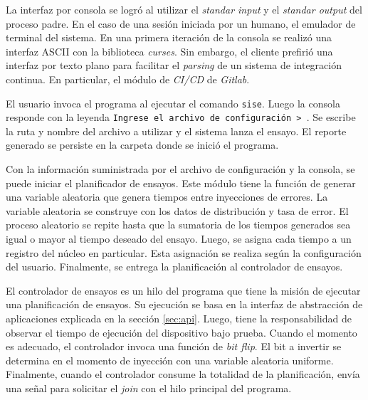 
La interfaz por consola se logró al utilizar el \emph{standar input} y el \emph{standar output} del proceso padre.
En el caso de una sesión iniciada por un humano, el emulador de terminal del sistema.
En una primera iteración de la consola se realizó una interfaz ASCII con la biblioteca \emph{curses}.
Sin embargo, el cliente prefirió una interfaz por texto plano para facilitar el \emph{parsing} de un sistema de integración continua.
En particular, el módulo de \emph{CI/CD} de \emph{Gitlab}.

El usuario invoca el programa al ejecutar el comando \texttt{sise}.
Luego la consola responde con la leyenda \texttt{Ingrese el archivo de configuración > }.
Se escribe la ruta y nombre del archivo a utilizar y el sistema lanza el ensayo.
El reporte generado se persiste en la carpeta donde se inició el programa.


Con la información suministrada por el archivo de configuración y la consola, se puede iniciar el planificador de ensayos.
Este módulo tiene la función de generar una variable aleatoria que genera tiempos entre inyecciones de errores.
La variable aleatoria se construye con los datos de distribución y tasa de error.
El proceso aleatorio se repite hasta que la sumatoria de los tiempos generados sea igual o mayor al tiempo deseado del ensayo.
Luego, se asigna cada tiempo a un registro del núcleo en particular.
Esta asignación se realiza según la configuración del usuario.
Finalmente, se entrega la planificación al controlador de ensayos.


El controlador de ensayos es un hilo del programa que tiene la misión de ejecutar una planificación de ensayos.
Su ejecución se basa en la interfaz de abstracción de aplicaciones explicada en la sección \ref{sec:api}.
Luego, tiene la responsabilidad de observar el tiempo de ejecución del dispositivo bajo prueba.
Cuando el momento es adecuado, el controlador invoca una función de \emph{bit flip}.
El bit a invertir se determina en el momento de inyección con una variable aleatoria uniforme.
Finalmente, cuando el controlador consume la totalidad de la planificación, envía una señal para solicitar el \emph{join} con el hilo principal del programa.


